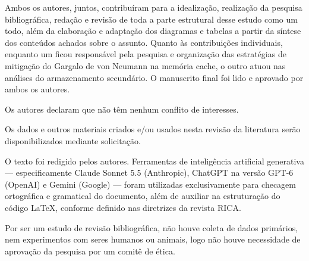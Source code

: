 \documentclass[portuguese]{sbcreviews-2025}%
\begin{document}
\begin{declarations}

\begin{contributions}
Ambos os autores, juntos, contribuíram para a idealização, realização da pesquisa bibliográfica, redação e revisão de toda a parte estrutural desse estudo como um todo, além da elaboração e adaptação dos diagramas e tabelas a partir da síntese dos conteúdos achados sobre o assunto. Quanto às contribuições individuais, 
enquanto um ficou responsável pela pesquisa e organização das estratégias de mitigação do Gargalo de von Neumann na memória cache, o outro atuou nas análises do armazenamento secundário. O manuscrito final foi lido e aprovado por ambos os autores.
\end{contributions}

\begin{interests}
Os autores declaram que não têm nenhum conflito de interesses. 
\end{interests}

\begin{materials}
Os dados e outros materiais criados e/ou usados nesta revisão da literatura 
serão disponibilizados mediante solicitação. 
\end{materials}

\begin{aitools}
O texto foi redigido pelos autores. Ferramentas de inteligência artificial generativa 
— especificamente Claude Sonnet 5.5 (Anthropic), ChatGPT na versão GPT-6 (OpenAI) e Gemini (Google) —  
foram utilizadas exclusivamente para checagem ortográfica e gramatical do documento, além de auxiliar na 
estruturação do código \LaTeX, conforme definido nas diretrizes da revista RICA.
\end{aitools}

\begin{furtherinformation}
Por ser um estudo de revisão bibliográfica, não houve coleta de dados primários, nem experimentos com seres 
humanos ou animais, logo não houve necessidade de aprovação da pesquisa por um comitê de ética.
\end{furtherinformation}

\end{declarations}



\end{document}
